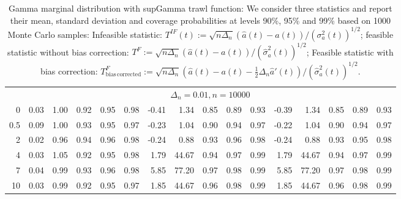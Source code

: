 \documentclass{article}
\theoremstyle{plain}
\theoremstyle{definition}
\theoremstyle{remark}
\begin{document}
\begin{appendix}
{\begin{table}[ht]
\begin{tabular}{r|rrrrr|rrrrr|rrrrr}
%   
%   
   \midrule
   &\multicolumn{15}{c}{$\Delta_n=0.01, n= 10000$}
   \\
 0 & 0.03 & 1.00 & 0.92 & 0.95 & 0.98 & -0.41 & 1.34 & 0.85 & 0.89 & 0.93 & -0.39 & 1.34 & 0.85 & 0.89 & 0.93 \\ 
  0.5 & 0.09 & 1.00 & 0.93 & 0.95 & 0.97 & -0.23 & 1.04 & 0.90 & 0.94 & 0.97 & -0.22 & 1.04 & 0.90 & 0.94 & 0.97 \\ 
  2 & 0.02 & 0.96 & 0.94 & 0.96 & 0.98 & -0.24 & 0.88 & 0.93 & 0.96 & 0.98 & -0.24 & 0.88 & 0.93 & 0.95 & 0.98 \\ 
  4 & 0.03 & 1.05 & 0.92 & 0.95 & 0.98 & 1.79 & 44.67 & 0.94 & 0.97 & 0.99 & 1.79 & 44.67 & 0.94 & 0.97 & 0.99 \\ 
  7 & 0.04 & 0.99 & 0.93 & 0.96 & 0.98 & 5.85 & 77.20 & 0.97 & 0.98 & 0.99 & 5.85 & 77.20 & 0.97 & 0.98 & 0.99 \\ 
  10 & 0.03 & 0.99 & 0.92 & 0.95 & 0.97 & 1.85 & 44.67 & 0.96 & 0.98 & 0.99 & 1.85 & 44.67 & 0.96 & 0.98 & 0.99 \\ 
   \bottomrule
\end{tabular}
\caption{ \label{tab:Gamma-LM-fixedt} Gamma marginal distribution with supGamma trawl function: We consider three statistics and report their mean, standard deviation and coverage probabilities at levels 90\%, 95\% and 99\% based on 1000 Monte Carlo samples: Infeasible statistic: $T^{IF}(t):=\sqrt{n\Delta_{n}}\left(\hat{a}(t)-a(t)\right)/(\sigma_a^2(t))^{1/2}$; feasible statistic without bias correction: $T^{F}:=\sqrt{n\Delta_{n}}\left(\hat{a}(t)-a(t)\right)/(\hat \sigma_a^2(t))^{1/2}$; Feasible statistic with bias correction: $T^{F}_{\mathrm{bias \, corrected}}:=\sqrt{n\Delta_{n}}\left(\hat{a}(t)-a(t)-\frac{1}{2}\Delta_n \hat a'(t)\right)/(\hat \sigma_a^2(t))^{1/2}$.}
\end{table}

}
\end{appendix}
\end{document}
